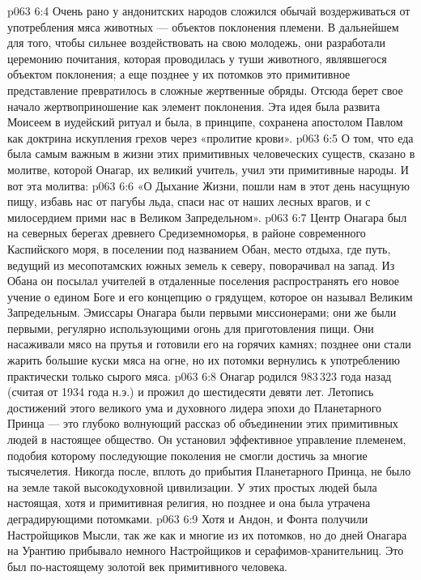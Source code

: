 \vs p063 6:4 Очень рано у андонитских народов сложился обычай воздерживаться от употребления мяса животных --- объектов поклонения племени. В дальнейшем для того, чтобы сильнее воздействовать на свою молодежь, они разработали церемонию почитания, которая проводилась у туши животного, являвшегося объектом поклонения; а еще позднее у их потомков это примитивное представление превратилось в сложные жертвенные обряды. Отсюда берет свое начало жертвоприношение как элемент поклонения. Эта идея была развита Моисеем в иудейский ритуал и была, в принципе, сохранена апостолом Павлом как доктрина искупления грехов через «пролитие крови».
\vs p063 6:5 О том, что еда была самым важным в жизни этих примитивных человеческих существ, сказано в молитве, которой Онагар, их великий учитель, учил эти примитивные народы. И вот эта молитва:
\vs p063 6:6 «О Дыхание Жизни, пошли нам в этот день насущную пищу, избавь нас от пагубы льда, спаси нас от наших лесных врагов, и с милосердием прими нас в Великом Запредельном».
\vs p063 6:7 \pc Центр Онагара был на северных берегах древнего Средиземноморья, в районе современного Каспийского моря, в поселении под названием Обан, место отдыха, где путь, ведущий из месопотамских южных земель к северу, поворачивал на запад. Из Обана он посылал учителей в отдаленные поселения распространять его новое учение о едином Боге и его концепцию о грядущем, которое он называл Великим Запредельным. Эмиссары Онагара были первыми миссионерами; они же были первыми, регулярно использующими огонь для приготовления пищи. Они насаживали мясо на прутья и готовили его на горячих камнях; позднее они стали жарить большие куски мяса на огне, но их потомки вернулись к употреблению практически только сырого мяса.
\vs p063 6:8 Онагар родился 983\,323 года назад (считая от 1934 года н.э.) и прожил до шестидесяти девяти лет. Летопись достижений этого великого ума и духовного лидера эпохи до Планетарного Принца --- это глубоко волнующий рассказ об объединении этих примитивных людей в настоящее общество. Он установил эффективное управление племенем, подобия которому последующие поколения не смогли достичь за многие тысячелетия. Никогда после, вплоть до прибытия Планетарного Принца, не было на земле такой высокодуховной цивилизации. У этих простых людей была настоящая, хотя и примитивная религия, но позднее и она была утрачена деградирующими потомками.
\vs p063 6:9 Хотя и Андон, и Фонта получили Настройщиков Мысли, так же как и многие из их потомков, но до дней Онагара на Урантию прибывало немного Настройщиков и серафимов\hyp{}хранительниц. Это был по\hyp{}настоящему золотой век примитивного человека.

